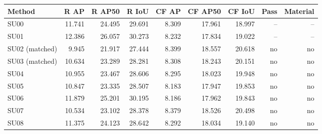 \begin{tabular}{lrrrrrrrr}
\toprule
Method & R AP & R AP50 & R IoU & CF AP & CF AP50 & CF IoU & Pass & Material \\
\midrule
SU00 & 11.741 & 24.495 & 29.691 & 8.309 & 17.961 & 18.997 & -- & -- \\
SU01 & 12.386 & 26.057 & 30.273 & 8.232 & 17.834 & 19.022 & -- & -- \\
SU02 (matched) & 9.945 & 21.917 & 27.444 & 8.399 & 18.557 & 20.618 & no & no \\
SU03 (matched) & 10.634 & 23.289 & 28.281 & 8.308 & 18.243 & 20.151 & no & no \\
SU04 & 10.955 & 23.467 & 28.606 & 8.295 & 18.023 & 19.948 & no & no \\
SU05 & 10.847 & 23.335 & 28.507 & 8.183 & 17.947 & 19.853 & no & no \\
SU06 & 11.879 & 25.201 & 30.195 & 8.186 & 17.962 & 19.843 & no & no \\
SU07 & 10.534 & 23.102 & 28.378 & 8.379 & 18.526 & 20.498 & no & no \\
SU08 & 11.375 & 24.123 & 28.642 & 8.292 & 18.034 & 19.140 & no & no \\
\bottomrule
\end{tabular}
